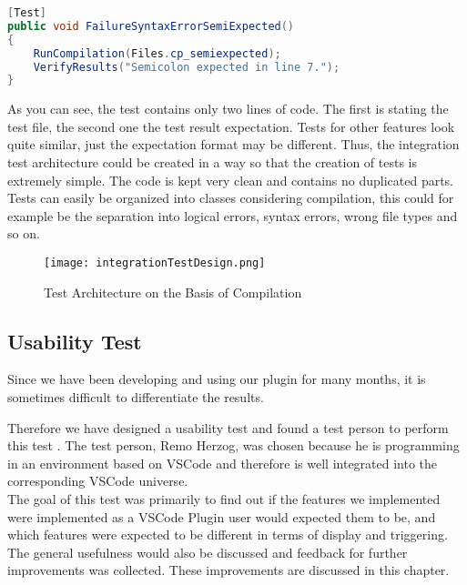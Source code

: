 \begin{lstlisting}[language=csharp, caption={Sample Test for Missing Semicolon}, captionpos=b, label={lst:demoTest}]
[Test]
public void FailureSyntaxErrorSemiExpected()
{
    RunCompilation(Files.cp_semiexpected);
    VerifyResults("Semicolon expected in line 7.");
}
\end{lstlisting}


As you can see, the test contains only two lines of code.
The first is stating the test file, the second one the test result expectation.
Tests for other features look quite similar, just the expectation format may be different.
Thus, the integration test architecture could be created in a way so that the creation of tests is extremely simple.
The code is kept very clean and contains no duplicated parts.
Tests can easily be organized into classes \textendash{} considering compilation, this could for example be the separation into logical errors, syntax errors, wrong file types and so on.

\begin{figure}[H]
    \centering
    \texttt{[image: integrationTestDesign.png]}
    \caption{Test Architecture on the Basis of Compilation}
    \label{fig:testArchitecture}
\end{figure}




\subsection{Usability Test}
Since we have been developing and using our plugin for many months,
it is sometimes difficult to differentiate the results.

Therefore we have designed a usability test and found a test person to perform this test \cite{interview-remo}.
The test person, Remo Herzog, was chosen because he is programming in an environment based on VSCode
and therefore is well integrated into the corresponding VSCode universe. \\

The goal of this test was primarily to find out if the features
we implemented were implemented as a VSCode Plugin user would expected them to be,
and which features were expected to be different in terms of display and triggering. \\

The general usefulness would also be discussed and feedback for further improvements was collected.
These improvements are discussed in this chapter.

